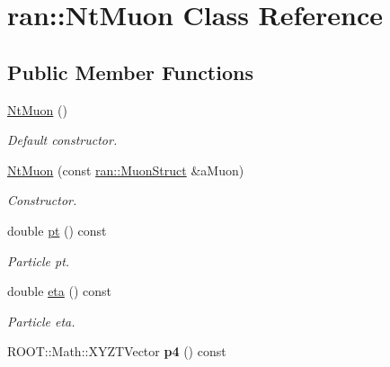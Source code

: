 \hypertarget{classran_1_1NtMuon}{\section{ran\-:\-:Nt\-Muon Class Reference}
\label{classran_1_1NtMuon}
}
\subsection*{Public Member Functions}
\begin{DoxyCompactItemize}
\item 
\hypertarget{classran_1_1NtMuon_a0f5e42b500d8a5f99a6cec3737208a23}{\hyperlink{classran_1_1NtMuon_a0f5e42b500d8a5f99a6cec3737208a23}{Nt\-Muon} ()}\label{classran_1_1NtMuon_a0f5e42b500d8a5f99a6cec3737208a23}

\begin{DoxyCompactList}\small\item\em Default constructor. \end{DoxyCompactList}\item 
\hypertarget{classran_1_1NtMuon_aa29eeb9e98f142ac9b3d135b853f40ea}{\hyperlink{classran_1_1NtMuon_aa29eeb9e98f142ac9b3d135b853f40ea}{Nt\-Muon} (const \hyperlink{structran_1_1MuonStruct}{ran\-::\-Muon\-Struct} \&a\-Muon)}\label{classran_1_1NtMuon_aa29eeb9e98f142ac9b3d135b853f40ea}

\begin{DoxyCompactList}\small\item\em Constructor. \end{DoxyCompactList}\item 
\hypertarget{classran_1_1NtMuon_a728cca4c8275292266356b31ad6068df}{double \hyperlink{classran_1_1NtMuon_a728cca4c8275292266356b31ad6068df}{pt} () const }\label{classran_1_1NtMuon_a728cca4c8275292266356b31ad6068df}

\begin{DoxyCompactList}\small\item\em Particle pt. \end{DoxyCompactList}\item 
\hypertarget{classran_1_1NtMuon_a45af4461d15632c21d3c97ec3183c6dc}{double \hyperlink{classran_1_1NtMuon_a45af4461d15632c21d3c97ec3183c6dc}{eta} () const }\label{classran_1_1NtMuon_a45af4461d15632c21d3c97ec3183c6dc}

\begin{DoxyCompactList}\small\item\em Particle eta. \end{DoxyCompactList}\item 
\hypertarget{classran_1_1NtMuon_abec703d904fd3969dec4d8514cf5cf77}{R\-O\-O\-T\-::\-Math\-::\-X\-Y\-Z\-T\-Vector {\bfseries p4} () const }\label{classran_1_1NtMuon_abec703d904fd3969dec4d8514cf5cf77}


\end{DoxyCompactItemize}

